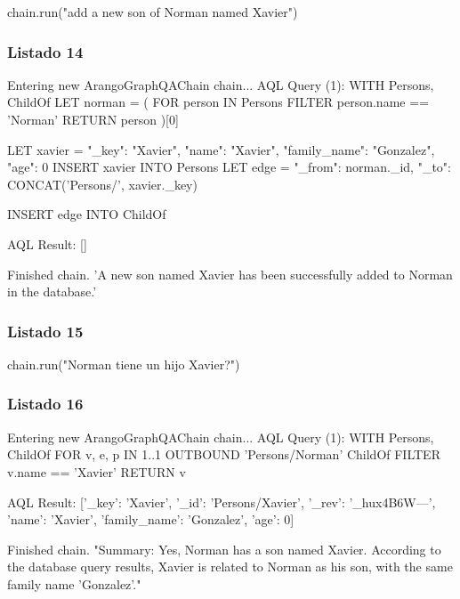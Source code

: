 \begin{APACode}
chain.run("add a new son of Norman named Xavier")
\end{APACode}

\subsubsection{Listado 14}
\label{anexo:code-4-4-1-14}

\begin{APACode}
Entering new ArangoGraphQAChain chain...
AQL Query (1):
WITH Persons, ChildOf
LET norman = (
    FOR person IN Persons
    FILTER person.name == 'Norman'
    RETURN person
)[0]

LET xavier = {
    "_key": "Xavier",
    "name": "Xavier",
    "family_name": "Gonzalez",
    "age": 0
}
INSERT xavier INTO Persons
LET edge = {
    "_from": norman._id,
    "_to": CONCAT('Persons/', xavier._key)
}

INSERT edge INTO ChildOf

AQL Result:
[]

Finished chain.
'A new son named Xavier has been successfully added to Norman in the database.'
\end{APACode}

\subsubsection{Listado 15}
\label{anexo:code-4-4-1-15}

\begin{APACode}
chain.run("Norman tiene un hijo Xavier?")
\end{APACode}

\subsubsection{Listado 16}
\label{anexo:code-4-4-1-16}

\begin{APACode}
Entering new ArangoGraphQAChain chain...
AQL Query (1):
WITH Persons, ChildOf
FOR v, e, p IN 1..1 OUTBOUND 'Persons/Norman' ChildOf
FILTER v.name == 'Xavier'
RETURN v

AQL Result:
[{'_key': 'Xavier', '_id': 'Persons/Xavier', '_rev': '_hux4B6W---',
  'name': 'Xavier', 'family_name': 'Gonzalez', 'age': 0}]

Finished chain.
"Summary: Yes, Norman has a son named Xavier. According to the database query results, Xavier is related to Norman as his son, with the same family name 'Gonzalez'."
\end{APACode}

